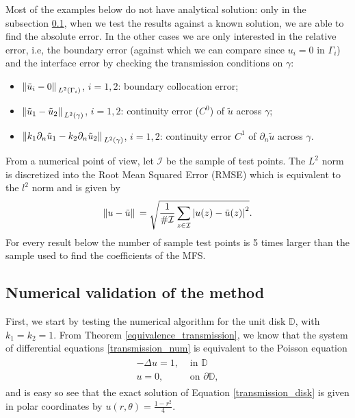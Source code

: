 Most of the examples below do not have analytical solution: only in the subsection \ref{transmission_val_subsection}, when we test the results against a known solution, we are able to find the absolute error. In the other cases we are only interested in the relative error, i.e, the boundary error (against which we can compare since \(u_i=0\) in \(\Gamma_i\)) and the interface error by checking the transmission conditions on \(\gamma\):
\begin{itemize}
    \item \(\norm*{\tilde{u}_i - 0}_{L^2(\Gamma_i)}\), \(i=1, 2\): boundary collocation error;
    \item \(\norm*{\tilde{u}_1 - \tilde{u}_2}_{L^2(\gamma)}\), \(i=1, 2\): continuity error (\(C^0\)) of \(\tilde{u}\) across \(\gamma\);
    \item \(\norm*{k_1 \partial_n\tilde{u}_1 - k_2 \partial_n\tilde{u}_2}_{L^2(\gamma)}\), \(i=1, 2\): continuity error \(C^1\) of \(\partial_n\tilde{u}\) across \(\gamma\).
\end{itemize}
From a numerical point of view, let \(\mathcal{I}\) be the sample of test points. The \(L^2\) norm is discretized into the Root Mean Squared Error (RMSE) which is equivalent to the \(l^2\) norm and is given by
\[
    \norm*{u-\tilde{u}}= \sqrt{\frac{1}{\#\mathcal{I}} \sum_{z \in \mathcal{I}} \abs{u(z)-\tilde{u}(z)}^2}.
\]
For every result below the number of sample test points is 5 times larger than the sample used to find the coefficients of the MFS. 

\subsection{Numerical validation of the method}\label{transmission_val_subsection}

First, we start by testing the numerical algorithm for the unit disk \(\mathbb{D}\), with \(k_1=k_2=1\). From Theorem \eqref{equivalence_transmission}, we know that the system of differential equations \eqref{transmission_num} is equivalent to the Poisson equation
\begin{align}\label{transmission_disk}
    \begin{split}
        -\Delta u = 1, & \text{ in } \mathbb{D}\\
        u = 0, & \text{ on } \partial\mathbb{D},
    \end{split}
\end{align}
and is easy so see that the exact solution of Equation \eqref{transmission_disk} is given in polar coordinates by \(u(r, \theta) = \frac{1-r^2}{4}\). 

